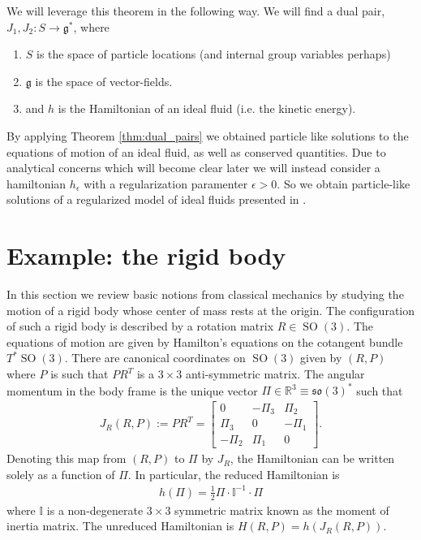 \documentclass[12pt]{amsart}
\newcommand{\so}{\ensuremath{\mathfrak{so}}}
\DeclareMathOperator{\SO}{SO}
\begin{document}
We will leverage this theorem in the following way.
We will find a dual pair, $J_1,J_2: S \to \mathfrak{g}^*$, where
\begin{enumerate}
\item $S$ is the space of particle locations (and internal group variables perhaps)
\item $\mathfrak{g}$ is the space of vector-fields.
\item and $h$ is the Hamiltonian of an ideal fluid (i.e. the kinetic energy).
\end{enumerate}
By applying Theorem \ref{thm:dual_pairs} we obtained particle like solutions to the equations of motion of an ideal fluid, as well as conserved quantities.
Due to analytical concerns which will become clear later
we will instead consider a hamiltonian $h_\epsilon$
with a regularization paramenter $\epsilon > 0$.
So we obtain particle-like solutions of a regularized model of ideal fluids
presented in \cite{MumfordMichor2013}.

\section{Example: the rigid body}
\label{sec:rigid_body}
  In this section we review basic notions from classical mechanics
by studying the motion of a rigid body whose center of mass rests
at the origin.
The configuration of such a rigid body is described by a
rotation matrix $R \in \SO(3)$.
The equations of motion are given by Hamilton's equations
on the cotangent bundle $T^*\SO(3)$.
There are canonical coordinates on $\SO(3)$ given by $(R,P)$
where $P$ is such that $P R^T$ is a $3 \times 3$ anti-symmetric matrix.
The angular momentum in the body frame is the
unique vector $\Pi \in \mathbb{R}^3 \equiv \so(3)^*$ such that
\begin{align*}
  J_R(R,P) := PR^T = \begin{bmatrix}
    0 & -\Pi_3 & \Pi_2 \\
    \Pi_3 & 0 & -\Pi_1 \\
    -\Pi_2 & \Pi_1 & 0 
    \end{bmatrix}.
\end{align*}
Denoting this map from $(R,P)$ to $\Pi$ by $J_R$,
the Hamiltonian can be written solely as a function
of $\Pi$.  In particular, the reduced Hamiltonian is
\begin{align*}
  h(\Pi) = \frac{1}{2}\Pi \cdot \mathbb{I}^{-1} \cdot \Pi
\end{align*}
where $\mathbb{I}$ is a non-degenerate $3\times 3$ symmetric matrix
known as the moment of inertia matrix.
The unreduced Hamiltonian is $H(R,P) = h(J_R(R,P))$.
\end{document}
